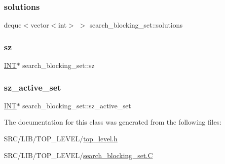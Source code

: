 \mbox{\label{classsearch__blocking__set_ab2e3c228a9e1aabf4de7a560b4d3a224}} 
\subsubsection{\texorpdfstring{solutions}{solutions}}
{\footnotesize\ttfamily deque$<$vector$<$int$>$ $>$ search\+\_\+blocking\+\_\+set\+::solutions}

\mbox{\label{classsearch__blocking__set_aafe272ad3370592d9dffde7e5cbbe116}} 
\subsubsection{\texorpdfstring{sz}{sz}}
{\footnotesize\ttfamily \mbox{\hyperlink{galois_8h_a09fddde158a3a20bd2dcadb609de11dc}{I\+NT}}$\ast$ search\+\_\+blocking\+\_\+set\+::sz}

\mbox{\label{classsearch__blocking__set_afead95cfc57413691d88d3388f5205c2}} 
\subsubsection{\texorpdfstring{sz\+\_\+active\+\_\+set}{sz\_active\_set}}
{\footnotesize\ttfamily \mbox{\hyperlink{galois_8h_a09fddde158a3a20bd2dcadb609de11dc}{I\+NT}}$\ast$ search\+\_\+blocking\+\_\+set\+::sz\+\_\+active\+\_\+set}



The documentation for this class was generated from the following files\+:\begin{DoxyCompactItemize}
\item 
S\+R\+C/\+L\+I\+B/\+T\+O\+P\+\_\+\+L\+E\+V\+E\+L/\mbox{\hyperlink{top__level_8h}{top\+\_\+level.\+h}}\item 
S\+R\+C/\+L\+I\+B/\+T\+O\+P\+\_\+\+L\+E\+V\+E\+L/\mbox{\hyperlink{search__blocking__set_8_c}{search\+\_\+blocking\+\_\+set.\+C}}\end{DoxyCompactItemize}
